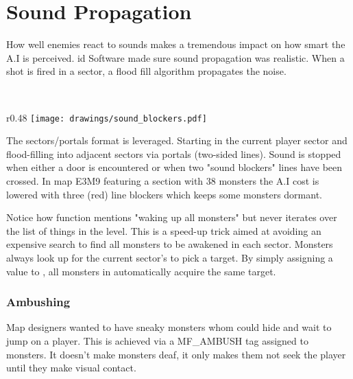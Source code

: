 \section{Sound Propagation}
How well enemies react to sounds makes a tremendous impact on how smart the A.I is perceived. id Software made sure sound propagation was realistic. When a shot is fired in a sector, a flood fill algorithm propagates the noise.\\
\par
{}\\

\begin{wrapfigure}[10]{r}{0.48\textwidth}
\centering
\texttt{[image: drawings/sound\_blockers.pdf]}
\end{wrapfigure}
  The sectors/portals format is leveraged. Starting in the current player sector and flood-filling into adjacent sectors via portals (two-sided lines). Sound is stopped when either a door is encountered or when two "sound blockers" lines have been crossed. In map E3M9 featuring a section with 38 monsters the A.I cost is lowered with three (red) line blockers which keeps some monsters dormant.\\
\par
Notice how function  mentions "waking up all monsters" but never iterates over the list of things in the level. This is a speed-up trick aimed at avoiding an expensive search to find all monsters to be awakened in each sector. Monsters always look up for the current sector's  to pick a target. By simply assigning a value to , all monsters in  automatically acquire the same target.\\
\par
{}
\par
\subsubsection{Ambushing}
Map designers wanted to have sneaky monsters whom could hide and wait to jump on a player. This is achieved via a MF\_AMBUSH tag assigned to monsters. It doesn't make monsters deaf, it only makes them not seek the player until they make visual contact.


